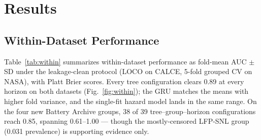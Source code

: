 \documentclass[preprint,12pt]{elsarticle}
\begin{document}
\section{Results}

\subsection{Within-Dataset Performance}
Table~\ref{tab:within} summarizes within-dataset performance as fold-mean AUC $\pm$ SD under the leakage-clean protocol (LOCO on CALCE, 5-fold grouped CV on NASA), with Platt Brier scores. Every tree configuration clears 0.89 at every horizon on both datasets (Fig.~\ref{fig:within}); the GRU matches the means with higher fold variance, and the single-fit hazard model lands in the same range. On the four new Battery Archive groups, 38 of 39 tree--group--horizon configurations reach 0.85, spanning 0.61--1.00 --- though the mostly-censored LFP-SNL group (0.031 prevalence) is supporting evidence only.
\end{document}
